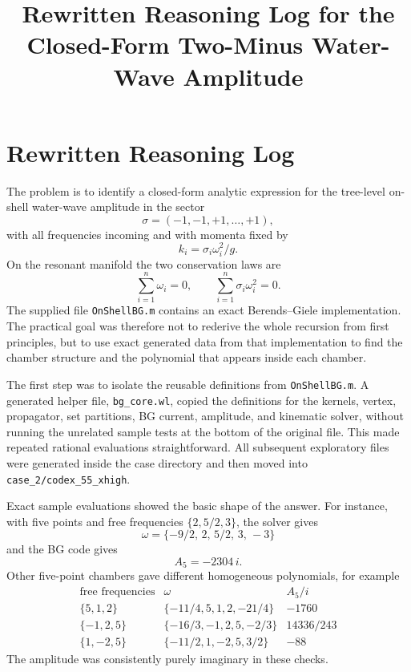\documentclass[11pt]{article}
\title{Rewritten Reasoning Log for the Closed-Form Two-Minus Water-Wave Amplitude}
\author{}
\date{}
\begin{document}
\maketitle


\section*{Rewritten Reasoning Log}

The problem is to identify a closed-form analytic expression for the tree-level
on-shell water-wave amplitude in the sector
\[
    \sigma=(-1,-1,+1,\ldots,+1),
\]
with all frequencies incoming and with momenta fixed by
\[
    k_i=\sigma_i\omega_i^2/g.
\]
On the resonant manifold the two conservation laws are
\[
    \sum_{i=1}^n \omega_i=0,
    \qquad
    \sum_{i=1}^n \sigma_i\omega_i^2=0.
\]
The supplied file \texttt{OnShellBG.m} contains an exact Berends--Giele
implementation. The practical goal was therefore not to rederive the whole
recursion from first principles, but to use exact generated data from that
implementation to find the chamber structure and the polynomial that appears
inside each chamber.

The first step was to isolate the reusable definitions from
\texttt{OnShellBG.m}. A generated helper file, \texttt{bg\_core.wl}, copied the
definitions for the kernels, vertex, propagator, set partitions, BG current,
amplitude, and kinematic solver, without running the unrelated sample tests at
the bottom of the original file. This made repeated rational evaluations
straightforward. All subsequent exploratory files were generated inside the
case directory and then moved into \texttt{case\_2/codex\_55\_xhigh}.

Exact sample evaluations showed the basic shape of the answer. For instance,
with five points and free frequencies \(\{2,5/2,3\}\), the solver gives
\[
    \omega=\{-9/2,\,2,\,5/2,\,3,\,-3\}
\]
and the BG code gives
\[
    A_5=-2304\,i.
\]
Other five-point chambers gave different homogeneous polynomials, for example
\[
\begin{array}{c|c|c}
\text{free frequencies} & \omega & A_5/i\\
\hline
\{5,1,2\} & \{-11/4,5,1,2,-21/4\} & -1760\\
\{-1,2,5\} & \{-16/3,-1,2,5,-2/3\} & 14336/243\\
\{1,-2,5\} & \{-11/2,1,-2,5,3/2\} & -88
\end{array}
\]
The amplitude was consistently purely imaginary in these checks.
\end{document}
